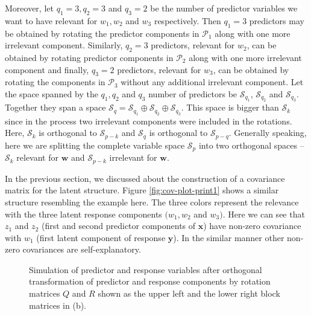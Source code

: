 \documentclass[3p,times,12pt,authoryear]{elsarticle}
\theoremstyle{definition}
\theoremstyle{definition}
\theoremstyle{remark}
\begin{document}
Moreover, let \(q_1 = 3, q_2 = 3\) and \(q_3 = 2\) be the number of
predictor variables we want to have relevant for \(w_1, w_2\) and
\(w_3\) respectively. Then \(q_1 = 3\) predictors may be obtained by
rotating the predictor components in \(\mathcal{P}_1\) along with one
more irrelevant component. Similarly, \(q_2 = 3\) predictors, relevant
for \(w_2\), can be obtained by rotating predictor components in
\(\mathcal{P}_2\) along with one more irrelevant component and finally,
\(q_3 = 2\) predictors, relevant for \(w_3\), can be obtained by
rotating the components in \(\mathcal{P}_3\) without any additional
irrelevant component. Let the space spanned by the \(q_1, q_2\) and
\(q_3\) number of predictors be \(\mathcal{S}_{q_1}\),
\(\mathcal{S}_{q_2}\) and \(\mathcal{S}_{q_3}\). Together they span a
space
\(\mathcal{S}_q = \mathcal{S}_{q_1} \oplus \mathcal{S}_{q_2} \oplus \mathcal{S}_{q_3}\).
This space is bigger than \(\mathcal{S}_k\) since in the process two
irrelevant components were included in the rotations. Here,
\(\mathcal{S}_k\) is orthogonal to \(\mathcal{S}_{p - k}\) and
\(\mathcal{S}_q\) is orthogonal to \(\mathcal{S}_{p - q}\). Generally
speaking, here we are splitting the complete variable space
\(\mathcal{S}_p\) into two orthogonal spaces -- \(\mathcal{S}_k\)
relevant for \(\mathbf{w}\) and \(\mathcal{S}_{p - k}\) irrelevant for
\(\mathbf{w}\).

In the previous section, we discussed about the construction of a
covariance matrix for the latent structure. Figure
\ref{fig:cov-plot-print1} shows a similar structure resembling the
example here. The three colors represent the relevance with the three
latent response components \((w_1, w_2\) and \(w_3)\). Here we can see
that \(z_{1}\) and \(z_{2}\) (first and second predictor components of
\(\mathbf{x}\)) have non-zero covariance with \(w_1\) (first latent
component of response \(\mathbf{y}\)). In the similar manner other
non-zero covariances are self-explanatory.

\begin{figure}[!htb]
\caption{Simulation of predictor and response variables after orthogonal transformation of predictor and response components by rotation matrices $Q$ and $R$ shown as the upper left and the lower right block matrices in (b).}\label{fig:cov-plot-print}
\end{figure}
\end{document}
